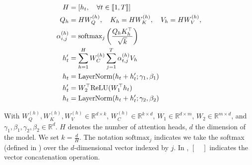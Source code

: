 {\begin{align}
H &= \left[h_t, \quad \forall t \in \llbracket 1, T \rrbracket\right] \labeq{transformer:mha-first}\\
Q_h & = H W_Q^{(h)}, \quad K_h = H W_K^{(h)}, \quad V_h = H W_V^{(h)}, \\
\alpha^{(h)}_{i,j} &= \textrm{softmax}_j \left(\frac{Q_h K_h^{\top}}{\sqrt{k}} \right) \labeq{transformer:alpha}\\
h'_t &= \sum_{h=1}^HW^{(h)}_{C}\sum_{j=1}^T\alpha^{(h)}_{t,j}V_h \labeq{transformer:mha-last}\\
h_t &= \textrm{LayerNorm}(h_t + h'_t; \gamma_1, \beta_1) \labeq{transformer:ffn-start}\\
h'_t &= W_2^{\top}\textrm{ReLU}(W_1^{\top}h_t)\\
h_t &= \textrm{LayerNorm}(h_t + h'_t; \gamma_2, \beta_2) \labeq{transformer:ffn-last}
\end{align}

With $W_Q^{(h)}, W_K^{(h)}, W_V^{(h)} \in \mathbb{R}^{d\times k}$, $W^{(h)}_{C} \in \mathbb{R}^{k\times d}$, $W_1 \in \mathbb{R}^{d \times m}$, $W_2 \in \mathbb{R}^{m \times d}$, and $\gamma_1, \beta_1, \gamma_2, \beta_2 \in \mathbb{R}^d$. $H$ denotes the number of attention heads, $d$ the dimension of the model. We set $k = \frac{d}{H}$. The notation $\textrm{softmax}_j$ indicates we take the softmax (defined in ) over the $d$-dimensional
vector indexed by $j$. In , $\left[\quad\right]$ indicates the vector concatenation operation.
}


